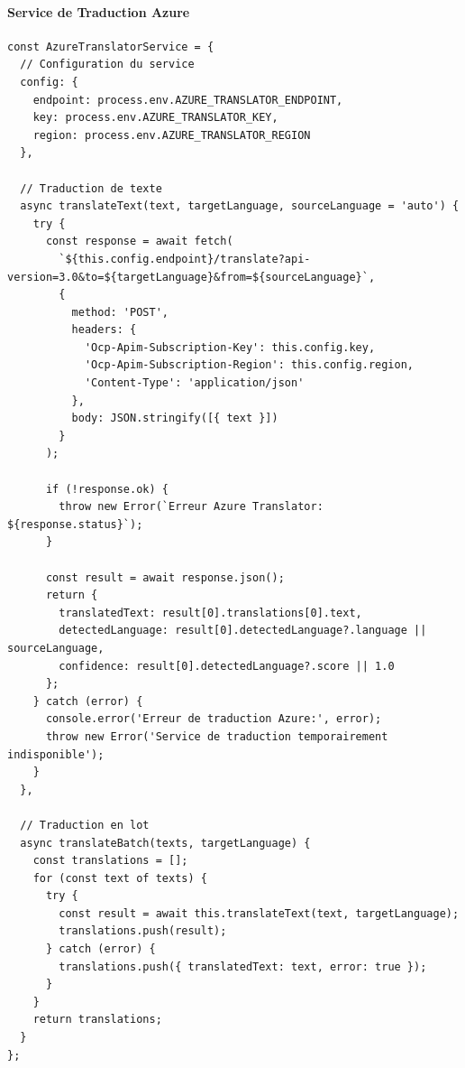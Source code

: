 \documentclass[12pt,a4paper]{article}
\begin{document}
\paragraph{Service de Traduction Azure}
\begin{lstlisting}[caption=Service d'intégration Azure Translator]
const AzureTranslatorService = {
  // Configuration du service
  config: {
    endpoint: process.env.AZURE_TRANSLATOR_ENDPOINT,
    key: process.env.AZURE_TRANSLATOR_KEY,
    region: process.env.AZURE_TRANSLATOR_REGION
  },

  // Traduction de texte
  async translateText(text, targetLanguage, sourceLanguage = 'auto') {
    try {
      const response = await fetch(
        `${this.config.endpoint}/translate?api-version=3.0&to=${targetLanguage}&from=${sourceLanguage}`,
        {
          method: 'POST',
          headers: {
            'Ocp-Apim-Subscription-Key': this.config.key,
            'Ocp-Apim-Subscription-Region': this.config.region,
            'Content-Type': 'application/json'
          },
          body: JSON.stringify([{ text }])
        }
      );

      if (!response.ok) {
        throw new Error(`Erreur Azure Translator: ${response.status}`);
      }

      const result = await response.json();
      return {
        translatedText: result[0].translations[0].text,
        detectedLanguage: result[0].detectedLanguage?.language || sourceLanguage,
        confidence: result[0].detectedLanguage?.score || 1.0
      };
    } catch (error) {
      console.error('Erreur de traduction Azure:', error);
      throw new Error('Service de traduction temporairement indisponible');
    }
  },

  // Traduction en lot
  async translateBatch(texts, targetLanguage) {
    const translations = [];
    for (const text of texts) {
      try {
        const result = await this.translateText(text, targetLanguage);
        translations.push(result);
      } catch (error) {
        translations.push({ translatedText: text, error: true });
      }
    }
    return translations;
  }
};
\end{lstlisting}
\end{document}
